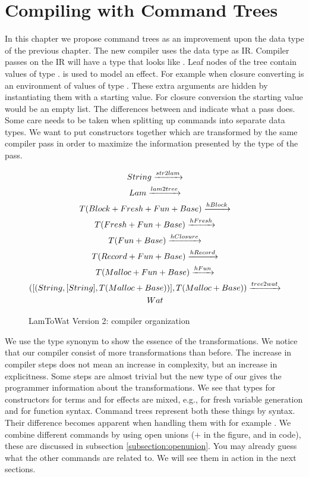 
\chapter{\label{chap:treecomp}Compiling with Command Trees}

In this chapter we propose command trees as an improvement upon the  data type of the previous chapter. The new compiler uses the  data type as IR. Compiler passes on the IR will have a type that looks like . Leaf nodes of the tree contain values of type .  is used to model an effect. For example when closure converting  is an environment of values of type . These extra arguments are hidden by instantiating them with a starting value. For closure conversion the starting value would be an empty list. The differences between  and  indicate what a pass does. Some care needs to be taken when splitting up commands into separate data types. We want to put constructors together which are transformed by the same compiler pass in order to maximize the information presented by the type of the pass.

\begin{figure}
\begin{gather*}
  String \xrightarrow{str2lam}\\
  Lam \xrightarrow{lam2tree}\\
  T (Block + Fresh + Fun + Base) \xrightarrow{hBlock}\\
  T         (Fresh + Fun + Base) \xrightarrow{hFresh}\\
  T                 (Fun + Base) \xrightarrow{hClosure}\\
  T        (Record + Fun + Base) \xrightarrow{hRecord}\\
  T        (Malloc + Fun + Base) \xrightarrow{hFun}\\
  ([(String,[String],T (Malloc + Base))], T (Malloc + Base)) \xrightarrow{tree2wat}\\
  Wat
\end{gather*}
\caption{LamToWat Version 2: compiler organization}
\label{fig:lam2watv2org}
\end{figure}

We use the type synonym  to show the essence of the transformations. We notice that our compiler consist of more transformations than before. The increase in compiler steps does not mean an increase in complexity, but an increase in explicitness. Some steps are almost trivial but the new type of our  gives the programmer information about the transformations. We see that types for constructors for terms and for effects are mixed, e.g.,  for fresh variable generation and  for function syntax. Command trees represent both these things by syntax. Their difference becomes apparent when handling them with for example . We combine different commands by using open unions ($+$ in the figure, and \icode{:+:} in code), these are discussed in subsection \ref{subsection:openunion}. You may already guess what the other commands are related to. We will see them in action in the next sections.

